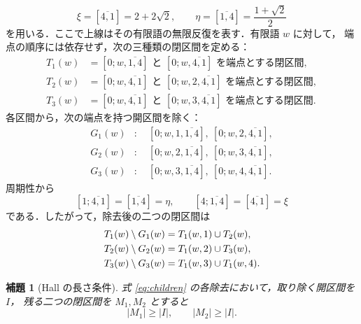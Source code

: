 \documentclass[10pt,a4paper]{ujarticle}
\newtheorem{lemma}[theorem]{補題}
\newcommand{\length}[1]{\lvert #1\rvert}
\begin{document}
\[
  \xi=[\overline{4,1}]=2+2\sqrt2,\qquad
  \eta=[\overline{1,4}]=\frac{1+\sqrt2}{2}
\]
を用いる．ここで上線はその有限語の無限反復を表す．有限語 $w$ に対して，
端点の順序には依存せず，次の三種類の閉区間を定める：
\begin{align*}
  T_1(w)&=\text{$[0;w,\overline{1,4}]$ と
                    $[0;w,\overline{4,1}]$ を端点とする閉区間},\\
  T_2(w)&=\text{$[0;w,\overline{4,1}]$ と
                    $[0;w,2,\overline{4,1}]$ を端点とする閉区間},\\
  T_3(w)&=\text{$[0;w,\overline{4,1}]$ と
                    $[0;w,3,\overline{4,1}]$ を端点とする閉区間}.
\end{align*}
各区間から，次の端点を持つ開区間を除く：
\begin{align*}
  G_1(w)&:\quad
    [0;w,1,\overline{1,4}],\
    [0;w,2,\overline{4,1}],\\
  G_2(w)&:\quad
    [0;w,2,\overline{1,4}],\
    [0;w,3,\overline{4,1}],\\
  G_3(w)&:\quad
    [0;w,3,\overline{1,4}],\
    [0;w,4,\overline{4,1}].
\end{align*}
周期性から
\[
  [1;\overline{4,1}]=[\overline{1,4}]=\eta,\qquad
  [4;\overline{1,4}]=[\overline{4,1}]=\xi
\]
である．したがって，除去後の二つの閉区間は
\begin{align}
\label{eq:children}
  T_1(w)\setminus G_1(w)&=T_1(w,1)\cup T_2(w),\notag\\
  T_2(w)\setminus G_2(w)&=T_1(w,2)\cup T_3(w),\\
  T_3(w)\setminus G_3(w)&=T_1(w,3)\cup T_1(w,4).\notag
\end{align}

\begin{lemma}[Hall の長さ条件]
\label{lemma:remove-interval}
式 \eqref{eq:children} の各除去において，取り除く開区間を $I$，
残る二つの閉区間を $M_1,M_2$ とすると
\[
  \length{M_1}\ge\length I,\qquad
  \length{M_2}\ge\length I.
\]
\end{lemma}
\end{document}
